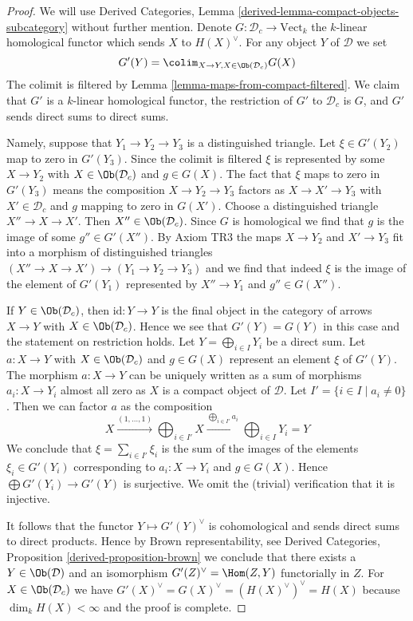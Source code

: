 \begin{proof}
We will use Derived Categories, Lemma
\ref{derived-lemma-compact-objects-subcategory} without further mention.
Denote $G : \mathcal{D}_c \to \text{Vect}_k$ the $k$-linear homological
functor which sends $X$ to $H(X)^\vee$. For any object $Y$ of $\mathcal{D}$
we set
$$
G'(Y) = \colim_{X \to Y, X \in \Ob(\mathcal{D}_c)} G(X)
$$
The colimit is filtered by Lemma \ref{lemma-maps-from-compact-filtered}.
We claim that $G'$ is a $k$-linear homological functor,
the restriction of $G'$ to $\mathcal{D}_c$ is $G$, and $G'$
sends direct sums to direct sums.

\medskip\noindent
Namely, suppose that $Y_1 \to Y_2 \to Y_3$ is a distinguished triangle.
Let $\xi \in G'(Y_2)$ map to zero in $G'(Y_3)$. Since the colimit is
filtered $\xi$ is represented by some $X \to Y_2$ with
$X \in \Ob(\mathcal{D}_c)$ and $g \in G(X)$.
The fact that $\xi$ maps to zero in $G'(Y_3)$ means the composition
$X \to Y_2 \to Y_3$ factors as $X \to X' \to Y_3$ with $X' \in \mathcal{D}_c$
and $g$ mapping to zero in $G(X')$. Choose a distinguished
triangle $X'' \to X \to X'$. Then $X'' \in \Ob(\mathcal{D}_c)$.
Since $G$ is homological we find that $g$ is the image of some
$g'' \in G'(X'')$. By Axiom TR3 the maps $X \to Y_2$ and $X' \to Y_3$ fit into
a morphism of distinguished triangles
$(X'' \to X \to X') \to (Y_1 \to Y_2 \to Y_3)$
and we find that indeed $\xi$ is the image of the
element of $G'(Y_1)$ represented by $X'' \to Y_1$ and $g'' \in G(X'')$.

\medskip\noindent
If $Y \in \Ob(\mathcal{D}_c)$, then $\text{id} : Y \to Y$ is the final
object in the category of arrows $X \to Y$ with $X \in \Ob(\mathcal{D}_c)$.
Hence we see that $G'(Y) = G(Y)$ in this case and the
statement on restriction holds. Let $Y = \bigoplus_{i \in I} Y_i$
be a direct sum. Let $a : X \to Y$ with $X \in \Ob(\mathcal{D}_c)$
and $g \in G(X)$ represent an element $\xi$ of $G'(Y)$.
The morphism $a : X \to Y$ can be uniquely written as a sum of morphisms
$a_i : X \to Y_i$ almost all zero as $X$ is a compact object of $\mathcal{D}$.
Let $I' = \{i \in I \mid a_i \not = 0\}$. Then we can factor
$a$ as the composition
$$
X \xrightarrow{(1, \ldots, 1)}
\bigoplus\nolimits_{i \in I'} X
\xrightarrow{\bigoplus_{i \in I'} a_i}
\bigoplus\nolimits_{i \in I} Y_i = Y
$$
We conclude that $\xi = \sum_{i \in I'} \xi_i$
is the sum of the images of the elements
$\xi_i \in G'(Y_i)$ corresponding to $a_i : X \to Y_i$
and $g \in G(X)$. Hence $\bigoplus G'(Y_i) \to G'(Y)$
is surjective. We omit the (trivial) verification that it is injective.

\medskip\noindent
It follows that the functor $Y \mapsto G'(Y)^\vee$ is cohomological
and sends direct sums to direct products. Hence by Brown representability,
see Derived Categories, Proposition \ref{derived-proposition-brown}
we conclude that there exists a $Y \in \Ob(\mathcal{D})$
and an isomorphism
$G'(Z)^\vee = \Hom(Z, Y)$ functorially in $Z$.
For $X \in \Ob(\mathcal{D}_c)$ we have
$G'(X)^\vee = G(X)^\vee = (H(X)^\vee)^\vee = H(X)$
because $\dim_k H(X) < \infty$ and the proof is complete.
\end{proof}

